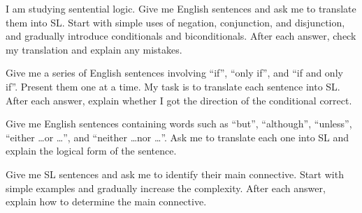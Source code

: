 \begin{genaipractice}
\item I am studying sentential logic. Give me English sentences and ask me to translate them into SL. Start with simple uses of negation, conjunction, and disjunction, and gradually introduce conditionals and biconditionals. After each answer, check my translation and explain any mistakes. 
\item Give me a series of English sentences involving ``if'', ``only if'', and ``if and only if''. Present them one at a time. My task is to translate each sentence into SL. After each answer, explain whether I got the direction of the conditional correct.
\item Give me English sentences containing words such as ``but'', ``although'', ``unless'', ``either \dots or \dots'', and ``neither \dots nor \dots''. Ask me to translate each one into SL and explain the logical form of the sentence. 
\item Give me SL sentences and ask me to identify their main connective. Start with simple examples and gradually increase the complexity. After each answer, explain how to determine the main connective. 
\end{genaipractice}
